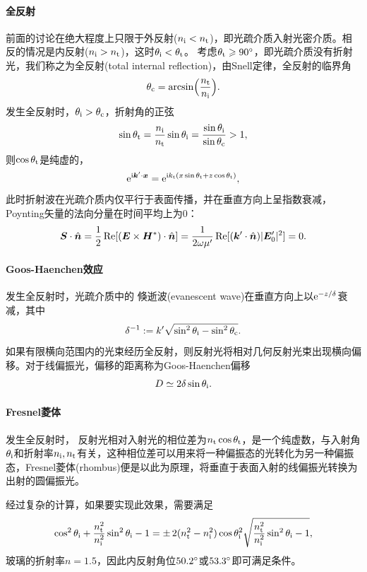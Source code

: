 \paragraph{全反射}

前面的讨论在绝大程度上只限于外反射($n_{\mathrm{i}}<n_\text t$)，即光疏介质入射光密介质。相反的情况是内反射($n_{\mathrm{i}}>n_\text t$)，这时$\theta_{\mathrm{i}}<\theta_\text t$。
考虑$\theta_\text t\geqslant90^\circ$，即光疏介质没有折射光，我们称之为全反射(total internal reflection)，由Snell定律，全反射的临界角
\begin{equation}
    \label{eqn:total reflect}
    \theta_\text c=\arcsin\Bigl(\frac{n_\text t}{n_{\mathrm{i}}}\Bigr).
\end{equation}
发生全反射时，$\theta_{\mathrm{i}}>\theta_\text c$，折射角的正弦
\[
    \sin\theta_\text t=\frac{n_{\mathrm{i}}}{n_\text t}\sin\theta_{\mathrm{i}}=\frac{\sin\theta_{\mathrm{i}}}{\sin\theta_\text c}>1,
\]
则$\cos\theta_\text t$是纯虚的，
\[
    \mathop{}\!\mathrm{e}^{\mathrm{i}\bm k'\cdot\bm x}=\mathop{}\!\mathrm{e}^{\mathrm{i} k_\text t(x\sin\theta_\text t+z\cos\theta_\text t)},
\]
此时折射波在光疏介质内仅平行于表面传播，并在垂直方向上呈指数衰减，Poynting矢量的法向分量在时间平均上为0：
\[
    \bm S\cdot\mathop{}\!\hat{\bm{n}}=\frac12\operatorname{Re}[(\bm E\times\bm H^\ast)\cdot\mathop{}\!\hat{\bm{n}}]=\frac1{2\omega\mu'}\operatorname{Re}[(\bm k'\cdot\mathop{}\!\hat{\bm{n}})|\bm E'_0|^2]=0.
\]

\paragraph{Goos-Haenchen效应}

发生全反射时，光疏介质中的
倏逝波(evanescent wave)在垂直方向上以$\mathop{}\!\mathrm{e}^{-z/\delta}$衰减，其中
\[
    \delta^{-1}:=k'\sqrt{\sin^2\theta_{\mathrm{i}}-\sin^2\theta_\text c}.
\]
如果有限横向范围内的光束经历全反射，则反射光将相对几何反射光束出现横向偏移。对于线偏振光，偏移的距离称为Goos-Haenchen偏移
\[
    D\simeq 2\delta\sin\theta_{\mathrm{i}}.
\]

\paragraph{Fresnel菱体}

发生全反射时，
反射光相对入射光的相位差为$n_\text t\cos\theta_\text t$，是一个纯虚数，与入射角$\theta_{\mathrm{i}}$和折射率$n_{\mathrm{i}},n_\text t$有关，这种相位差可以用来将一种偏振态的光转化为另一种偏振态，Fresnel菱体(rhombus)便是以此为原理，将垂直于表面入射的线偏振光转换为出射的圆偏振光。

经过复杂的计算，如果要实现此效果，需要满足
\[
    \cos^2\theta_{\mathrm{i}}+\frac{n_\text t^2}{n_{\mathrm{i}}^2}\sin^2\theta_{\mathrm{i}}-1=\pm\,2(n_\text t^2-n_{\mathrm{i}}^2)\cos\theta_{\mathrm{i}}^2\sqrt{\frac{n_\text t^2}{n_{\mathrm{i}}^2}\sin^2\theta_{\mathrm{i}}-1},
\]
玻璃的折射率$n=1.5$，因此内反射角位$50.2^\circ$或$53.3^\circ$即可满足条件。


